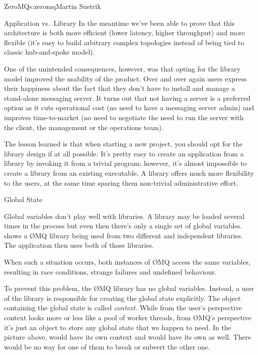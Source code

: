 \begin{aosachapter}{ZeroMQ}{s:zeromq}{Martin Sustrik}
\begin{aosasect1}{Application vs.\ Library}
In the meantime we've been able to prove that this architecture is
both more efficient (lower latency, higher throughput) and more
flexible (it's easy to build arbitrary complex topologies instead of
being tied to classic hub-and-spoke model).

One of the unintended consequences, however, was that opting for the
library model improved the usability of the product. Over and over
again users express their happiness about the fact that they don't
have to install and manage a stand-alone messaging server. It turns
out that not having a server is a preferred option as it cuts
operational cost (no need to have a messaging server admin) and
improves time-to-market (no need to negotiate the need to run the
server with the client, the management or the operations team).

The lesson learned is that when starting a new project, you should opt
for the library design if at all possible. It's pretty easy to create
an application from a library by invoking it from a trivial program;
however, it's almost impossible to create a library from an existing
executable. A library offers much more flexibility to the users, at the
same time sparing them non-trivial administrative effort.

\end{aosasect1}

\begin{aosasect1}{Global State}

Global variables don't play well with libraries. A library may be loaded
several times in the process but even then there's
only a single set of global
variables.  shows a {\O}MQ library being
used from two different and independent libraries. The application
then uses both of those libraries.


When such a situation occurs, both instances of {\O}MQ access the same
variables, resulting in race conditions, strange failures and undefined
behaviour.

To prevent this problem, the {\O}MQ library has no global variables. Instead,
a user of the library is responsible for creating the global state
explicitly. The object containing the global state is called
\emph{context}. While from the user's perspective context looks more or
less like a pool of worker threads, from {\O}MQ's perspective it's just
an object to store any global state that we happen to need. 
In the picture above,  would have its own context and 
would have its own as well. There would be no way for one of them to
break or subvert the other one.


\end{aosasect1}
\end{aosachapter}
